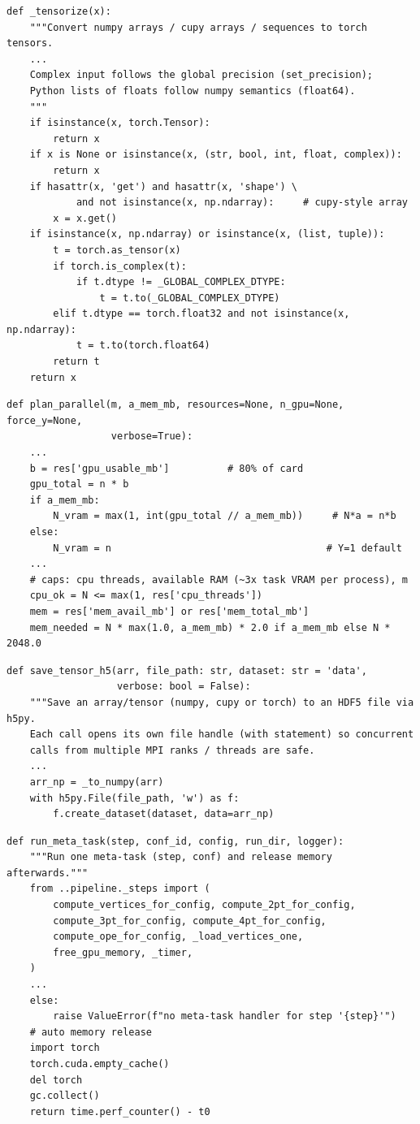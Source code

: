 \documentclass[UTF8]{ctexart}
\begin{document}
\begin{lstlisting}[caption={torch 后端自动转换核心}]
def _tensorize(x):
    """Convert numpy arrays / cupy arrays / sequences to torch tensors.
    ...
    Complex input follows the global precision (set_precision);
    Python lists of floats follow numpy semantics (float64).
    """
    if isinstance(x, torch.Tensor):
        return x
    if x is None or isinstance(x, (str, bool, int, float, complex)):
        return x
    if hasattr(x, 'get') and hasattr(x, 'shape') \
            and not isinstance(x, np.ndarray):     # cupy-style array
        x = x.get()
    if isinstance(x, np.ndarray) or isinstance(x, (list, tuple)):
        t = torch.as_tensor(x)
        if torch.is_complex(t):
            if t.dtype != _GLOBAL_COMPLEX_DTYPE:
                t = t.to(_GLOBAL_COMPLEX_DTYPE)
        elif t.dtype == torch.float32 and not isinstance(x, np.ndarray):
            t = t.to(torch.float64)
        return t
    return x
\end{lstlisting}

\begin{lstlisting}[caption={用户公式进程规划（节选）}]
def plan_parallel(m, a_mem_mb, resources=None, n_gpu=None, force_y=None,
                  verbose=True):
    ...
    b = res['gpu_usable_mb']          # 80% of card
    gpu_total = n * b
    if a_mem_mb:
        N_vram = max(1, int(gpu_total // a_mem_mb))     # N*a = n*b
    else:
        N_vram = n                                     # Y=1 default
    ...
    # caps: cpu threads, available RAM (~3x task VRAM per process), m
    cpu_ok = N <= max(1, res['cpu_threads'])
    mem = res['mem_avail_mb'] or res['mem_total_mb']
    mem_needed = N * max(1.0, a_mem_mb) * 2.0 if a_mem_mb else N * 2048.0
\end{lstlisting}

\begin{lstlisting}[caption={h5 唯一读写工具（节选）}]
def save_tensor_h5(arr, file_path: str, dataset: str = 'data',
                   verbose: bool = False):
    """Save an array/tensor (numpy, cupy or torch) to an HDF5 file via h5py.
    Each call opens its own file handle (with statement) so concurrent
    calls from multiple MPI ranks / threads are safe.
    ...
    arr_np = _to_numpy(arr)
    with h5py.File(file_path, 'w') as f:
        f.create_dataset(dataset, data=arr_np)
\end{lstlisting}

\begin{lstlisting}[caption={元任务执行与自动释放（节选）}]
def run_meta_task(step, conf_id, config, run_dir, logger):
    """Run one meta-task (step, conf) and release memory afterwards."""
    from ..pipeline._steps import (
        compute_vertices_for_config, compute_2pt_for_config,
        compute_3pt_for_config, compute_4pt_for_config,
        compute_ope_for_config, _load_vertices_one,
        free_gpu_memory, _timer,
    )
    ...
    else:
        raise ValueError(f"no meta-task handler for step '{step}'")
    # auto memory release
    import torch
    torch.cuda.empty_cache()
    del torch
    gc.collect()
    return time.perf_counter() - t0
\end{lstlisting}
\end{document}
